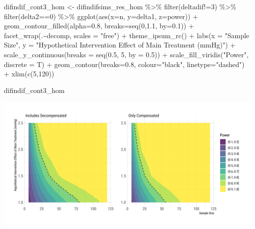\documentclass[
]{article}
\newenvironment{Shaded}{\begin{snugshade}}{\end{snugshade}}
\newcommand{\AttributeTok}[1]{\textcolor[rgb]{0.77,0.63,0.00}{#1}}
\newcommand{\DecValTok}[1]{\textcolor[rgb]{0.00,0.00,0.81}{#1}}
\newcommand{\FloatTok}[1]{\textcolor[rgb]{0.00,0.00,0.81}{#1}}
\newcommand{\FunctionTok}[1]{\textcolor[rgb]{0.00,0.00,0.00}{#1}}
\newcommand{\NormalTok}[1]{#1}
\newcommand{\OtherTok}[1]{\textcolor[rgb]{0.56,0.35,0.01}{#1}}
\newcommand{\SpecialCharTok}[1]{\textcolor[rgb]{0.00,0.00,0.00}{#1}}
\newcommand{\StringTok}[1]{\textcolor[rgb]{0.31,0.60,0.02}{#1}}
\begin{document}
\begin{Shaded}
\begin{Highlighting}[]
\NormalTok{difindif\_cont3\_hom }\OtherTok{\textless{}{-}}\NormalTok{ difindifsims\_res\_hom }\SpecialCharTok{\%\textgreater{}\%} 
  \FunctionTok{filter}\NormalTok{(deltadif}\SpecialCharTok{!=}\DecValTok{3}\NormalTok{) }\SpecialCharTok{\%\textgreater{}\%} 
  \FunctionTok{filter}\NormalTok{(delta2}\SpecialCharTok{==}\DecValTok{0}\NormalTok{) }\SpecialCharTok{\%\textgreater{}\%} 
  \FunctionTok{ggplot}\NormalTok{(}\FunctionTok{aes}\NormalTok{(}\AttributeTok{x=}\NormalTok{n, }\AttributeTok{y=}\NormalTok{delta1, }\AttributeTok{z=}\NormalTok{power)) }\SpecialCharTok{+}
  \FunctionTok{geom\_contour\_filled}\NormalTok{(}\AttributeTok{alpha=}\FloatTok{0.8}\NormalTok{, }\AttributeTok{breaks=}\FunctionTok{seq}\NormalTok{(}\DecValTok{0}\NormalTok{,}\FloatTok{1.1}\NormalTok{, }\AttributeTok{by=}\FloatTok{0.1}\NormalTok{)) }\SpecialCharTok{+}
  \FunctionTok{facet\_wrap}\NormalTok{(.}\SpecialCharTok{\textasciitilde{}}\NormalTok{decomp, }\AttributeTok{scales =} \StringTok{"free"}\NormalTok{) }\SpecialCharTok{+}
  \FunctionTok{theme\_ipsum\_rc}\NormalTok{() }\SpecialCharTok{+}
  \FunctionTok{labs}\NormalTok{(}\AttributeTok{x =} \StringTok{"Sample Size"}\NormalTok{,}
       \AttributeTok{y =} \StringTok{"Hypothetical Intervention Effect of Main Treatment (mmHg)"}\NormalTok{) }\SpecialCharTok{+}
  \FunctionTok{scale\_y\_continuous}\NormalTok{(}\AttributeTok{breaks =} \FunctionTok{seq}\NormalTok{(}\FloatTok{0.5}\NormalTok{, }\DecValTok{5}\NormalTok{, }\AttributeTok{by =} \FloatTok{0.5}\NormalTok{)) }\SpecialCharTok{+}
  \FunctionTok{scale\_fill\_viridis}\NormalTok{(}\StringTok{"Power"}\NormalTok{, }\AttributeTok{discrete =}\NormalTok{ T) }\SpecialCharTok{+}
  \FunctionTok{geom\_contour}\NormalTok{(}\AttributeTok{breaks=}\FloatTok{0.8}\NormalTok{, }\AttributeTok{colour=}\StringTok{"black"}\NormalTok{, }\AttributeTok{linetype=}\StringTok{"dashed"}\NormalTok{) }\SpecialCharTok{+}
  \FunctionTok{xlim}\NormalTok{(}\FunctionTok{c}\NormalTok{(}\DecValTok{5}\NormalTok{,}\DecValTok{120}\NormalTok{))}

\NormalTok{difindif\_cont3\_hom}
\end{Highlighting}
\end{Shaded}

\includegraphics{figures/unnamed-chunk-80-1.png}
\end{document}
